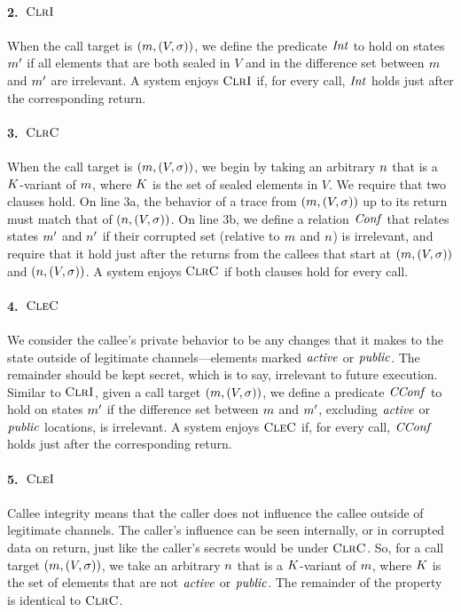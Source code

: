 \documentclass[10pt,conference]{ieeetran}%
\theoremstyle{definition}
\begin{document}
\paragraph*{2.~\(\textnormal{\sc ClrI}\)}
When the call target is \((m,(V,\sigma))\), we define the predicate \(\mathit{Int}\) to hold
on states \(m'\) if all elements that are both sealed in \(V\) and in the difference
set between \(m\) and \(m'\) are irrelevant. A system enjoys \(\textnormal{\sc ClrI}\) if, for every
call, \(\mathit{Int}\) holds just after the corresponding return.

\paragraph*{3.~\(\textnormal{\sc ClrC}\)}
When the call target is \((m,(V,\sigma))\), we begin by taking an arbitrary \(n\)
that is a \(K\)-variant of \(m\), where \(K\) is the set of sealed elements
in \(V\). We require that two clauses hold. On line 3a, the behavior of a trace from
\((m,(V,\sigma))\) up to its return must match that of \((n,(V,\sigma))\).
On line 3b, we define a relation \(\mathit{Conf}\) that relates states \(m'\) and \(n'\)
if their corrupted set (relative to \(m\) and \(n\)) is irrelevant, and require
that it hold just after the returns from the callees that start at \((m,(V,\sigma))\) and \((n,(V,\sigma))\).
A system enjoys \(\textnormal{\sc ClrC}\) if both clauses hold for every call.

\paragraph*{4.~\(\textnormal{\sc CleC}\)}
We consider the callee's private behavior to be any changes that it makes to the state
outside of legitimate channels---elements marked \(\mathit{active}\) or \(\mathit{public}\). The remainder
should be kept secret, which is to say, irrelevant to future execution. Similar to \(\textnormal{\sc ClrI}\), given a call target
\((m,(V,\sigma))\), we define a predicate \(\mathit{CConf}\) to hold
on states \(m'\) if the difference set between \(m\) and \(m'\), excluding
\(\mathit{active}\) or \(\mathit{public}\) locations, is irrelevant.
A system enjoys \(\textnormal{\sc CleC}\) if, for every call, \(\mathit{CConf}\) holds just after the corresponding return.

\paragraph*{5.~\(\textnormal{\sc CleI}\)}
Callee integrity means that the caller does not influence the callee outside of legitimate
channels. The caller's influence can be seen internally, or in corrupted data on return,
just like the caller's secrets would be under \(\textnormal{\sc ClrC}\). So, for a call target
\((m,(V,\sigma))\), we take an arbitrary \(n\) that is a \(K\)-variant
of \(m\), where \(K\) is the set of elements that are not \(\mathit{active}\)
or \(\mathit{public}\). The remainder of the property is identical to \(\textnormal{\sc ClrC}\).
\end{document}
